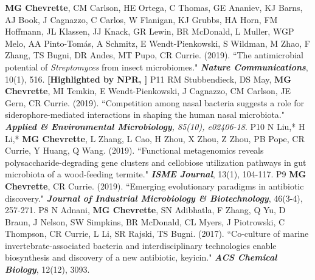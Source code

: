 \begin{cvpubs}
  \cvpub
    {\textbf{MG Chevrette}, CM Carlson, HE Ortega, C Thomas, GE Ananiev, KJ Barns, AJ Book, J Cagnazzo, C Carlos, W Flanigan, KJ Grubbs, HA Horn, FM Hoffmann, JL Klassen, JJ Knack, GR Lewin, BR McDonald, L Muller, WGP Melo, AA Pinto-Tom\'{a}s, A Schmitz, E Wendt-Pienkowski, S Wildman, M Zhao, F Zhang, TS Bugni, DR Andes, MT Pupo, CR Currie. (2019). ``The antimicrobial potential of \textit{Streptomyces} from insect microbiomes." \textit{\textbf{Nature Communications}}, 10(1), 516. \textbf{\textit{}}
    \linebreak \textbf{[Highlighted by NPR, \textit{}]}
    } %
    {P11} %
  \cvpub
    {RM Stubbendieck, DS May, \textbf{MG Chevrette}, MI Temkin, E Wendt-Pienkowski, J Cagnazzo, CM Carlson, JE Gern, CR Currie. (2019). ``Competition among nasal bacteria suggests a role for siderophore-mediated interactions in shaping the human nasal microbiota." \textit{\textbf{Applied \& Environmental Microbiology}, 85(10), e02406-18}. \textbf{\textit{}}
    } %
    {P10} %
  \cvpub
    {N Liu,* H Li,* \textbf{MG Chevrette}, L Zhang, L Cao, H Zhou, X Zhou, Z Zhou, PB Pope, CR Currie, Y Huang, Q Wang. (2019). ``Functional metagenomics reveals polysaccharide-degrading gene clusters and cellobiose utilization pathways in gut microbiota of a wood-feeding termite." \textit{\textbf{ISME Journal}}, 13(1), 104-117. \textbf{\textit{}}     
    } %
    {P9} %
  \cvpub
    {\textbf{MG Chevrette}, CR Currie. (2019). ``Emerging evolutionary paradigms in antibiotic discovery." \textit{\textbf{Journal of Industrial Microbiology \& Biotechnology}}, 46(3-4), 257-271. \textbf{\textit{}}
    } %
    {P8} %
  \cvpub
    {N Adnani, \textbf{MG Chevrette}, SN Adibhatla, F Zhang, Q Yu, D Braun, J Nelson, SW Simpkins, BR McDonald, CL Myers, J Piotrowski, C Thompson, CR Currie, L Li, SR Rajski, TS Bugni. (2017). ``Co-culture of marine invertebrate-associated bacteria and interdisciplinary technologies enable biosynthesis and discovery of a new antibiotic, keyicin." \textit{\textbf{ACS Chemical Biology}}, 12(12), 3093.  \textbf{\textit{}} 
}
\end{cvpubs}
